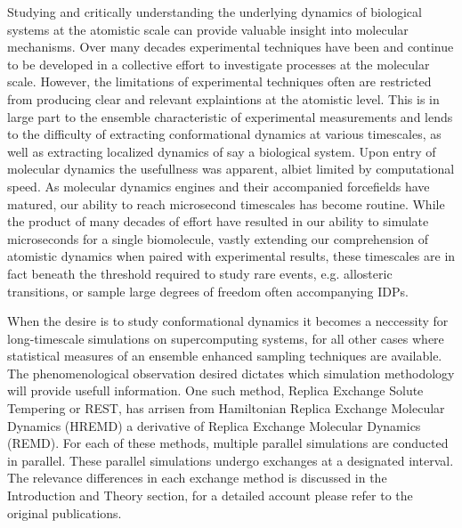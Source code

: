 Studying and critically understanding the underlying dynamics of biological systems at the atomistic scale can provide valuable insight into molecular mechanisms. 
Over many decades experimental techniques have been and continue to be developed in a collective effort to investigate processes at the molecular scale.
However, the limitations of experimental techniques often are restricted from producing clear and relevant explaintions at the atomistic level. 
This is in large part to the ensemble characteristic of experimental measurements and lends to the difficulty of extracting conformational dynamics at various timescales, as well as extracting localized dynamics of say a biological system. 
Upon entry of molecular dynamics the usefullness was apparent, albiet limited by computational speed. 
As molecular dynamics engines\cite{Weiner1981,gotz2012,salomon-ferrer2013,Brooks1983,Brooks2009,VanDerSpoel2005} and their accompanied forcefields\cite{Huang2016,Ploetz2021,Cornell1995,lindorff-larsen2010,Robustelli2018,Jakobsen2015,Piana2020} have matured, our ability to reach microsecond timescales has become routine. 
While the product of many decades of effort have resulted in our ability to simulate microseconds for a single biomolecule, vastly extending our comprehension of atomistic dynamics when paired with experimental results, these timescales are in fact beneath the threshold required to study rare events, e.g. allosteric transitions, or sample large degrees of freedom often accompanying IDPs. 

When the desire is to study conformational dynamics it becomes a neccessity for long-timescale simulations on supercomputing systems\cite{Shaw2009,Shaw2014}, for all other cases where statistical measures of an ensemble enhanced sampling techniques are available\cite{Lee2016,Wang2011,Qi2018,Vitalis2009,Zhang2023,Ray2023,Prakash2018}. 
The phenomenological observation desired dictates which simulation methodology will provide usefull information.
One such method, Replica Exchange Solute Tempering or REST\cite{Liu2005,Wang2011,Zhang2023}, has arrisen from Hamiltonian Replica Exchange Molecular Dynamics (HREMD) a derivative of Replica Exchange Molecular Dynamics (REMD). 
For each of these methods, multiple parallel simulations are conducted in parallel. 
These parallel simulations undergo exchanges at a designated interval.
The relevance differences in each exchange method is discussed in the Introduction and Theory section, for a detailed account please refer to the original publications\cite{Sugita1999,Liu2005,Wang2011}.
 